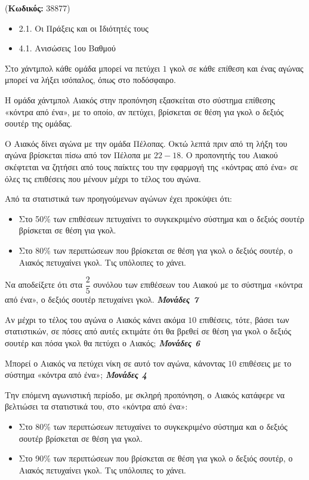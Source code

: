 \documentclass[11pt,a4paper,twoside]{book}
\newcounter{askhsh}[chapter]
\renewcommand{\theaskhsh}{
	\bf{\titlefont{\Large{\thechapter}}.\arabic{askhsh}}
}
\newcommand{\Askhsh}[2]{\refstepcounter{askhsh}{\titlefont{Άσκηση\theaskhsh} - \textcolor{maincolor}{ΘΕΜΑ #2}} ({\small{\textbf{Κωδικός:} #1}})\\}{}
\newenvironment{ylh}{
\begin{tcolorbox}[
breakable,
enhanced standard,
titlerule=0pt,
toprule=0pt, 
rightrule=0pt, 
bottomrule=0pt,
title={\titlefont Ύλη άσκησης},
colback=white,
opacityback=0,
left=2mm,
top=1mm,
bottom=0mm,
boxrule=0pt,
colframe=white,
borderline west={1.5mm}{0pt}{secondarycolor},
leftrule=2mm,
sharp corners,
coltitle=black
]
\begin{itemize}[leftmargin=3mm, itemsep=0mm, label=\textcolor{secondarycolor}{{\small\faBook}}]
}{
\end{itemize}
\end{tcolorbox}
}
\newcommand{\monades}[1]{
\hspace*{\fill}
\textbf{\textit{\textcolor{maincolor}{Μονάδες #1}}}}
\begin{document}
\vspace{4mm}
\Askhsh{38877}{4}
\begin{ylh}
    \item 2.1. Οι Πράξεις και οι Ιδιότητές τους
    \item 4.1. Ανισώσεις 1ου Βαθμού
\end{ylh}

Στο χάντμπολ κάθε ομάδα μπορεί να πετύχει $1$ γκολ σε κάθε επίθεση και ένας αγώνας μπορεί να λήξει ισόπαλος, όπως στο ποδόσφαιρο.

Η ομάδα χάντμπολ Αιακός στην προπόνηση εξασκείται στο σύστημα επίθεσης «κόντρα από ένα», με το οποίο, αν πετύχει, βρίσκεται σε θέση για γκολ ο δεξιός σουτέρ της ομάδας.

\begin{alist}
\item Ο Αιακός δίνει αγώνα με την ομάδα Πέλοπας. Οκτώ λεπτά πριν από τη λήξη του αγώνα βρίσκεται πίσω από τον Πέλοπα με $22-18$. Ο προπονητής του Αιακού σκέφτεται να ζητήσει από τους παίκτες του την εφαρμογή της «κόντρας από ένα» σε όλες τις επιθέσεις που μένουν μέχρι το τέλος του αγώνα.

Από τα στατιστικά των προηγούμενων αγώνων έχει προκύψει ότι:

\begin{itemize}
\item
  Στο 50\% των επιθέσεων πετυχαίνει το συγκεκριμένο σύστημα και ο δεξιός σουτέρ βρίσκεται σε θέση για γκολ.
\item
  Στο 80\% των περιπτώσεων που βρίσκεται σε θέση για γκολ ο δεξιός σουτέρ, ο Αιακός πετυχαίνει γκολ. Τις υπόλοιπες το χάνει.
\end{itemize}
\begin{rlist}
\item
  Να αποδείξετε ότι στα $\dfrac{2}{5}$ συνόλου των επιθέσεων του Αιακού με το σύστημα «κόντρα από ένα», ο δεξιός σουτέρ πετυχαίνει γκολ.\monades{7}
\item
  Αν μέχρι το τέλος του αγώνα ο Αιακός κάνει ακόμα $10$ επιθέσεις, τότε, βάσει των στατιστικών, σε πόσες από αυτές εκτιμάτε ότι θα βρεθεί σε θέση για γκολ ο δεξιός σουτέρ και πόσα γκολ θα πετύχει ο Αιακός;\monades{6}
\item
  Μπορεί ο Αιακός να πετύχει νίκη σε αυτό τον αγώνα, κάνοντας $10$ επιθέσεις με το σύστημα «κόντρα από ένα»;\monades{4}
\end{rlist}
\item Την επόμενη αγωνιστική περίοδο, με σκληρή προπόνηση, ο Αιακός κατάφερε να βελτιώσει τα στατιστικά του, στο «κόντρα από ένα»:
\begin{itemize}
\item
  Στο 80\% των περιπτώσεων πετυχαίνει το συγκεκριμένο σύστημα και ο δεξιός σουτέρ βρίσκεται σε θέση για γκολ.
\item
  Στο 90\% των περιπτώσεων που βρίσκεται σε θέση για γκολ ο δεξιός σουτέρ, ο Αιακός πετυχαίνει γκολ. Τις υπόλοιπες το χάνει.
\end{itemize}


\end{alist}
\end{document}
